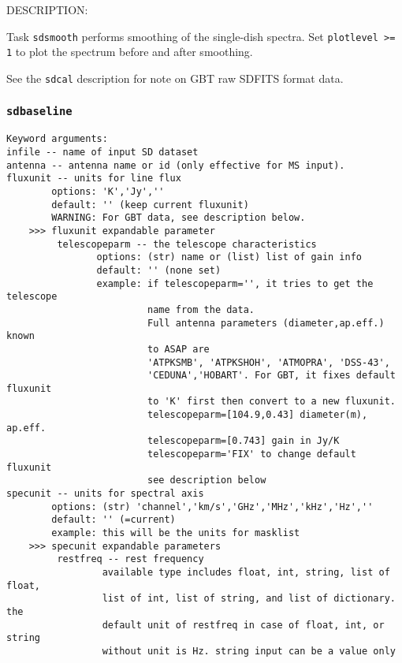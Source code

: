    DESCRIPTION:

Task {\tt sdsmooth} performs smoothing of the single-dish spectra.
Set {\tt plotlevel >= 1} to plot the spectrum before and after smoothing.
    
See the {\tt sdcal} description for note on GBT raw SDFITS format data.

\medskip

 
\subsubsection{{\tt sdbaseline}}
\label{section:sd.sdtasks.tasks.sdbaseline}

\begin{verbatim}
Keyword arguments:
infile -- name of input SD dataset
antenna -- antenna name or id (only effective for MS input). 
fluxunit -- units for line flux
        options: 'K','Jy',''
        default: '' (keep current fluxunit)
        WARNING: For GBT data, see description below.
    >>> fluxunit expandable parameter
         telescopeparm -- the telescope characteristics
                options: (str) name or (list) list of gain info
                default: '' (none set)
                example: if telescopeparm='', it tries to get the telescope
                         name from the data.
                         Full antenna parameters (diameter,ap.eff.) known
                         to ASAP are
                         'ATPKSMB', 'ATPKSHOH', 'ATMOPRA', 'DSS-43',
                         'CEDUNA','HOBART'. For GBT, it fixes default fluxunit
                         to 'K' first then convert to a new fluxunit.
                         telescopeparm=[104.9,0.43] diameter(m), ap.eff.
                         telescopeparm=[0.743] gain in Jy/K
                         telescopeparm='FIX' to change default fluxunit
                         see description below
specunit -- units for spectral axis
        options: (str) 'channel','km/s','GHz','MHz','kHz','Hz',''
        default: '' (=current)
        example: this will be the units for masklist
    >>> specunit expandable parameters
         restfreq -- rest frequency
                 available type includes float, int, string, list of float, 
                 list of int, list of string, and list of dictionary. the 
                 default unit of restfreq in case of float, int, or string 
                 without unit is Hz. string input can be a value only 

\end{verbatim}
